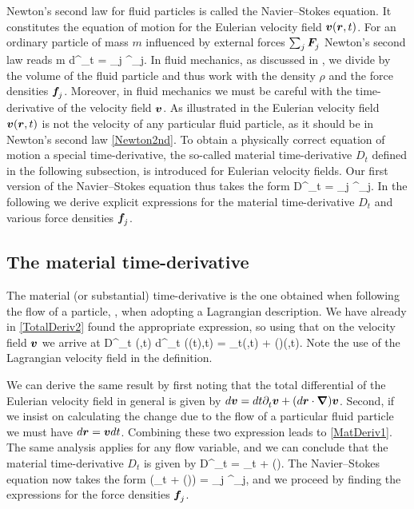 Newton's second law for fluid particles is called the
Navier--Stokes equation. It constitutes the equation of motion for
the Eulerian velocity field $\bm{v}(\bm{r},t)$. For an ordinary
particle of mass $m$ influenced by external forces $\sum_j
\bm{F}^{{}}_j$ Newton's second law reads
%
 m\: d^{{}}_t \vvv  = \sum_j \FFF^{{}}_j.
 \eeq
%
In fluid mechanics, as discussed in , we
divide by the volume of the fluid particle and thus work with the
density $\rho$ and the force densities $\bm{f}^{{}}_j$. Moreover, in
fluid mechanics we must be careful with the time-derivative of the
velocity field $\bm{v}$. As illustrated in 
the Eulerian velocity field $\bm{v}(\bm{r},t)$ is not the velocity of
any particular fluid particle, as it should be in Newton's second
law \eqref{Newton2nd}. To obtain a physically correct equation of
motion a special time-derivative, the so-called material
time-derivative $D^{{}}_t$ defined in the following subsection, is
introduced for Eulerian velocity fields. Our first version of the
Navier--Stokes equation thus takes the form
%
 \rho\: D^{{}}_t \vvv  = \sum_j \fff^{{}}_j.
 \eeq
%
In the following we derive explicit expressions for the material
time-derivative $D^{{}}_t$ and various force densities
$\bm{f}^{{}}_j$.


\subsection{The material time-derivative}

The material (or substantial) time-derivative is the one obtained
when following the flow of a particle, \ie, when adopting a
Lagrangian description. We have already in \eqref{TotalDeriv2}
found the appropriate expression, so using that on the velocity
field $\bm{v}$ we arrive at
%
 \rho\: D^{{}}_t \vvv(\rrr,t) \equiv
 \rho\: d^{{}}_t \vvv\big(\rrr(t),t\big)
 = \pp_t\vvv(\rrr,t) + (\vvv\scap\nablabf)\vvv(\rrr,t).
 \eeq
%
Note the use of the Lagrangian velocity field in the definition.

We can derive the same result by first noting that the total
differential of the Eulerian velocity field in general is given by
$d\bm{v} = dt \partial^{{}}_t\bm{v}  + (d\bm{r}\cdot\boldsymbol{\nabla})\bm{v}$. Second, if we
insist on calculating the change due to the flow of a particular
fluid particle we must have $d\bm{r} = \bm{v} dt$. Combining these two
expression leads to \eqref{MatDeriv1}. The same analysis applies
for any flow variable, and we can conclude that the material
time-derivative $D^{{}}_t$ is given by
%
 D^{{}}_t = \pp_t + (\vvv\scap\nablabf).
 \eeq
%
The Navier--Stokes equation now takes the form
%
 \rho\Big(\pp_t \vvv + (\vvv\scap\nablabf)\vvv\Big) =
 \sum_j \fff^{{}}_j,
 \eeq
%
and we proceed by finding the expressions for the force densities
$\bm{f}^{{}}_j$.


